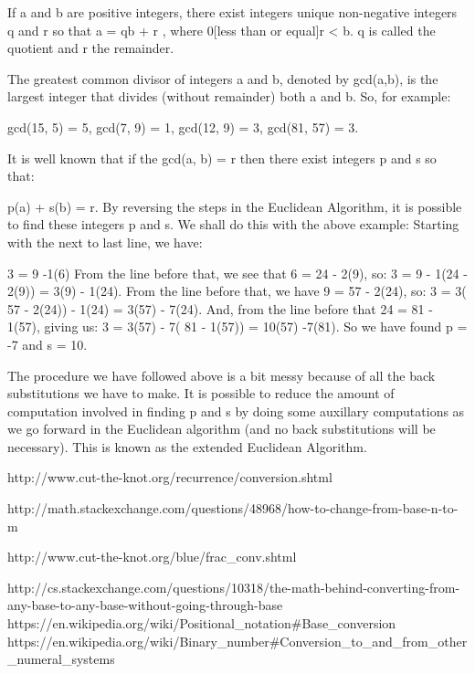 If a and b are positive integers, there exist integers unique non-negative integers q and r so that
a = qb + r , where 0[less than or equal]r < b.
q is called the quotient and r the remainder.

The greatest common divisor of integers a and b, denoted by gcd(a,b), is the largest integer that divides (without remainder) both a and b. So, for example:

gcd(15, 5) = 5,	gcd(7, 9) = 1,	gcd(12, 9) = 3,	gcd(81, 57) = 3.

It is well known that if the gcd(a, b) = r then there exist integers p and s so that:

p(a) + s(b) = r.
By reversing the steps in the Euclidean Algorithm, it is possible to find these integers p and s. We shall do this with the above example:
Starting with the next to last line, we have:

3 = 9 -1(6)
From the line before that, we see that 6 = 24 - 2(9), so:
3 = 9 - 1(24 - 2(9)) = 3(9) - 1(24).
From the line before that, we have 9 = 57 - 2(24), so:
3 = 3( 57 - 2(24)) - 1(24) = 3(57) - 7(24).
And, from the line before that 24 = 81 - 1(57), giving us:
3 = 3(57) - 7( 81 - 1(57)) = 10(57) -7(81).
So we have found p = -7 and s = 10.

The procedure we have followed above is a bit messy because of all the back substitutions we have to make. It is possible to reduce the amount of computation involved in finding p and s by doing some auxillary computations as we go forward in the Euclidean algorithm (and no back substitutions will be necessary). This is known as the extended Euclidean Algorithm.



http://www.cut-the-knot.org/recurrence/conversion.shtml

http://math.stackexchange.com/questions/48968/how-to-change-from-base-n-to-m

http://www.cut-the-knot.org/blue/frac_conv.shtml

http://cs.stackexchange.com/questions/10318/the-math-behind-converting-from-any-base-to-any-base-without-going-through-base
https://en.wikipedia.org/wiki/Positional_notation#Base_conversion
https://en.wikipedia.org/wiki/Binary_number#Conversion_to_and_from_other_numeral_systems

